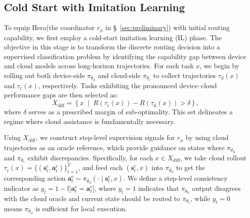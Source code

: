 \documentclass{article}
\newcommand{\name}{Hera\xspace}
\begin{document}
\subsection{Cold Start with Imitation Learning}
\label{sec:hera_il}
To equip \name (the coordinator $r_\phi$ in \S~\ref{sec:preliminary}) with initial routing capability, we first employ a cold-start imitation learning (IL) phase. The objective in this stage is to transform the discrete routing decision into a supervised classification problem by identifying the capability gap between device and cloud models across long-horizon trajectories.
For each task $x$, we begin by rolling out both device-side $\pi_{\theta_\mathrm{d}}$ and cloud-side $\pi_{\theta_\mathrm{c}}$ to collect trajectories $\tau_{\mathrm{d}} (x)$ and $\tau_{\mathrm{c}}(x)$, respectively.
Tasks exhibiting the pronounced device--cloud performance gaps are then selected as:
\begin{equation}
X_{\text{diff}} = \left\{ x \;\middle|\; R(\tau_{\mathrm{c}}(x)) - R(\tau_{\mathrm{d}}(x)) > \delta \right\},
\end{equation}
where $\delta$ serves as a prescribed margin of sub-optimality. This set delineates a regime where cloud assistance is fundamentally necessary.

Using $X_{\text{diff}}$, we construct step-level supervision signals for $r_\phi$ by using cloud trajectories as an oracle reference, which provide guidance on states where $\pi_{\theta_\mathrm{d}}$ and $\pi_{\theta_\mathrm{c}}$ exhibit discrepancies. 
Specifically, for each $x \in X_{\text{diff}}$, we take cloud rollout 
$\tau_{\mathrm{c}}(x) = \{({\mathbf{s}}^{\mathrm{c}}_t, {\mathbf{a}}_t^{\mathrm{c}})\}_{t=1}^T$, and feed each $({\mathbf{s}}^\mathrm{c}_t,x)$ into $\pi_{\theta_\mathrm{d}}$ to get the corresponding action
$
{\mathbf{a}}_t^{\mathrm{e}} \sim \pi_{\theta_\mathrm{d}}(\cdot \mid {\mathbf{s}}^\mathrm{c}_t,x)
$.
We define a step-level consistency indicator as $
y_t = 1- \mathbb{I}\big[{\mathbf{a}}_t^{\mathrm{e}} = {\mathbf{a}}_t^{\mathrm{c}}\big]
$, where $y_t=1$ indicates that $\pi_{\theta_\mathrm{d}}$ output disagrees with the cloud oracle and current state should be routed to $\pi_{\theta_\mathrm{c}}$, while $y_t=0$ means $\pi_{\theta_\mathrm{d}}$ is sufficient for local execution.
\end{document}
